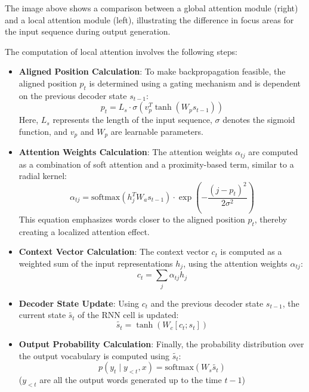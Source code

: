 The image above shows a comparison between a global attention module (right) and a local attention module (left), illustrating the difference in focus areas for the input sequence during output generation.

The computation of local attention involves the following steps:

\begin{itemize}
    
    \item \textbf{Aligned Position Calculation}:
    To make backpropagation feasible, the aligned position $p_t$ is determined using a gating mechanism and is dependent on the previous decoder state $s_{t-1}$:
    $$
    p_t = L_s \cdot \sigma(v^T_p \tanh(W_p s_{t-1}))
    $$
    Here, $L_s$ represents the length of the input sequence, $\sigma$ denotes the sigmoid function, and $v_p$ and $W_p$ are learnable parameters.
    \vspace{0.25cm}
    
    \item \textbf{Attention Weights Calculation}:
    The attention weights $\alpha_{tj}$ are computed as a combination of soft attention and a proximity-based term, similar to a radial kernel:
    $$
    \alpha_{tj} = \text{softmax}(h_j^T W_a s_{t-1}) \cdot \exp\left(-\frac{(j - p_t)^2}{2\sigma^2}\right)
    $$
    This equation emphasizes words closer to the aligned position $p_t$, thereby creating a localized attention effect.
    \vspace{0.25cm}
    
    \item \textbf{Context Vector Calculation}:
    The context vector $c_t$ is computed as a weighted sum of the input representations $h_j$, using the attention weights $\alpha_{tj}$:
    $$\label{eq:local-attention}
    c_t = \sum_{j} \alpha_{tj} h_j
    $$
    
    \item \textbf{Decoder State Update}:
    Using $c_t$ and the previous decoder state $s_{t-1}$, the current state $\widetilde{s_t}$ of the RNN cell is updated:
    $$
    \widetilde{s_t} = \tanh(W_c [c_t; s_t])
    $$
    
    \item \textbf{Output Probability Calculation}:
    Finally, the probability distribution over the output vocabulary is computed using $\widetilde{s_t}$:
    $$
    p(y_t \mid y_{<t}, x) = \text{softmax}(W_s \widetilde{s_t})
    $$
    ($y_{<t}$ are all the output words generated up to the time $t-1$)

\end{itemize}


